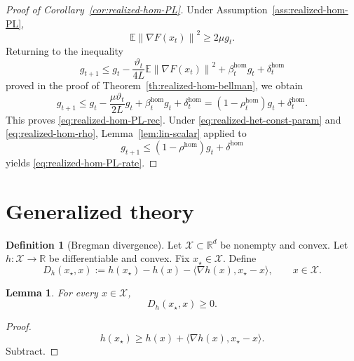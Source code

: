 \documentclass{article}
\newtheorem{lemma}[theorem]{Lemma}
\theoremstyle{definition}
\newtheorem{definition}[theorem]{Definition}
\newcommand{\EE}{\mathbb E}
\newcommand{\norm}[1]{\left\lVert #1\right\rVert}
\begin{document}
\begin{proof}[Proof of Corollary~\ref{cor:realized-hom-PL}]
Under Assumption~\ref{ass:realized-hom-PL},
\[
\EE\norm{\nabla F(x_t)}^2\ge 2\mu g_t.
\]
Returning to the inequality
\[
g_{t+1}
\le
g_t
-
\frac{\vartheta_t}{4L}\EE\norm{\nabla F(x_t)}^2
+
\beta_t^{\mathrm{hom}}g_t
+
\delta_t^{\mathrm{hom}}
\]
proved in the proof of Theorem~\ref{th:realized-hom-bellman}, we obtain
\[
g_{t+1}
\le
g_t-\frac{\mu\vartheta_t}{2L}g_t+\beta_t^{\mathrm{hom}}g_t+\delta_t^{\mathrm{hom}}
=
(1-\rho_t^{\mathrm{hom}})g_t+\delta_t^{\mathrm{hom}}.
\]
This proves \eqref{eq:realized-hom-PL-rec}. Under \eqref{eq:realized-het-const-param} and
\eqref{eq:realized-hom-rho}, Lemma~\ref{lem:lin-scalar} applied to
\[
g_{t+1}\le (1-\rho^{\mathrm{hom}})g_t+\delta^{\mathrm{hom}}
\]
yields \eqref{eq:realized-hom-PL-rate}.
\end{proof}

\section{Generalized theory}

\begin{definition}[Bregman divergence]
Let $\mathcal X\subset\mathbb R^d$ be nonempty and convex.
Let $h:\mathcal X\to\mathbb R$ be differentiable and convex.
Fix $x_\star\in\mathcal X$.
Define
\begin{equation}
D_h(x_\star,x)
:=
h(x_\star)-h(x)-\langle \nabla h(x),x_\star-x\rangle,
\qquad x\in\mathcal X.
\label{eq:Bregman}
\end{equation}
\end{definition}

\begin{lemma}
For every $x\in\mathcal X$,
\begin{equation}
D_h(x_\star,x)\ge 0.
\label{eq:Bregman_nonnegative}
\end{equation}
\end{lemma}

\begin{proof}
\[
h(x_\star)\ge h(x)+\langle \nabla h(x),x_\star-x\rangle.
\]
Subtract.
\end{proof}
\end{document}
